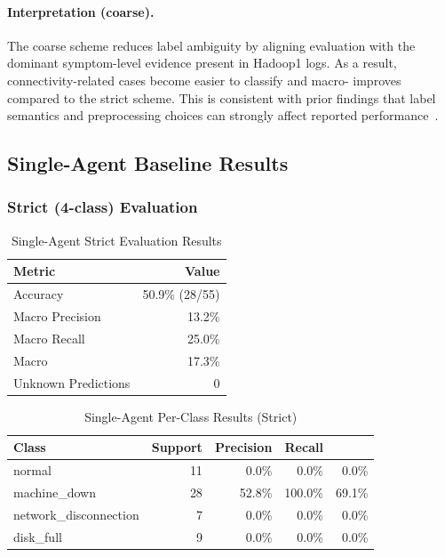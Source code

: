 \paragraph{Interpretation (coarse).}
The coarse scheme reduces label ambiguity by aligning evaluation with the dominant symptom-level
evidence present in Hadoop1 logs. As a result, connectivity-related cases become easier to
classify and macro-\fone{} improves compared to the strict scheme. This is consistent with prior
findings that label semantics and preprocessing choices can strongly affect reported
performance~\cite{le2022logdlhowfar}.

\subsection{Single-Agent Baseline Results}

\subsubsection{Strict (4-class) Evaluation}

\begin{table}[H]
\centering
\caption{Single-Agent Strict Evaluation Results}
\label{tab:sa-strict}
\begin{tabular}{lr}
\toprule
\textbf{Metric} & \textbf{Value} \\
\midrule
Accuracy            & 50.9\% (28/55) \\
Macro Precision     & 13.2\% \\
Macro Recall        & 25.0\% \\
Macro \fone{}       & 17.3\% \\
Unknown Predictions & 0 \\
\bottomrule
\end{tabular}
\end{table}

\begin{table}[H]
\centering
\caption{Single-Agent Per-Class Results (Strict)}
\label{tab:sa-strict-perclass}
\begin{tabular}{lrrrr}
\toprule
\textbf{Class} & \textbf{Support} & \textbf{Precision} & \textbf{Recall} & \textbf{\fone{}} \\
\midrule
normal                 & 11 & 0.0\%  & 0.0\%   & 0.0\%  \\
machine\_down          & 28 & 52.8\% & 100.0\% & 69.1\% \\
network\_disconnection & 7  & 0.0\%  & 0.0\%   & 0.0\%  \\
disk\_full             & 9  & 0.0\%  & 0.0\%   & 0.0\%  \\
\bottomrule
\end{tabular}
\end{table}

